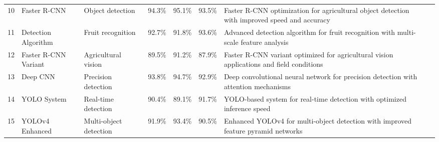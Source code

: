 \begin{table*}[htbp]
\begin{tabular}{p{}p{}p{}p{}p{}p{}p{}p{}}
 10 & Faster R-CNN & Object detection & 94.3\% & 95.1\% & 93.5\% & Faster R-CNN optimization for agricultural object detection with improved speed and accuracy & \cite{wan2020faster} \\
 11 & Detection Algorithm & Fruit recognition & 92.7\% & 91.8\% & 93.6\% & Advanced detection algorithm for fruit recognition with multi-scale feature analysis & \cite{jia2020detection} \\
 12 & Faster R-CNN Variant & Agricultural vision & 89.5\% & 91.2\% & 87.9\% & Faster R-CNN variant optimized for agricultural vision applications and field conditions & \cite{fu2020faster} \\
 13 & Deep CNN & Precision detection & 93.8\% & 94.7\% & 92.9\% & Deep convolutional neural network for precision detection with attention mechanisms & \cite{chu2021deep} \\
 14 & YOLO System & Real-time detection & 90.4\% & 89.1\% & 91.7\% & YOLO-based system for real-time detection with optimized inference speed & \cite{liu2020yolo} \\
 15 & YOLOv4 Enhanced & Multi-object detection & 91.9\% & 93.4\% & 90.5\% & Enhanced YOLOv4 for multi-object detection with improved feature pyramid networks & \cite{gai2023detection} \\
\bottomrule
\end{tabular}
\end{table*}

